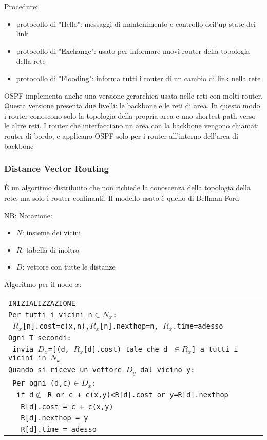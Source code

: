 \documentclass[12pt, a4paper]{article}
\begin{document}
Procedure:
\begin{itemize}
    \item protocollo di "Hello": messaggi di mantenimento e controllo deil'up-state dei link
    \item protocollo di "Exchange": usato per informare nuovi router della topologia della rete
    \item protocollo di "Flooding": informa tutti i router di un cambio di link nella rete
\end{itemize}

OSPF implementa anche una versione gerarchica usata nelle reti con molti router. Questa versione presenta due livelli:
le backbone e le reti di area. In questo modo i router conoscono solo la topologia della propria area e uno 
shortest path verso le altre reti. I router che interfacciano un area con la backbone vengono chiamati router di 
bordo, e applicano OSPF solo per i router all'interno dell'area di backbone

\subsubsection{Distance Vector Routing}
È un algoritmo distribuito che non richiede la conoscenza della topologia della rete, ma solo i router confinanti.
Il modello usato è quello di Bellman-Ford 

NB: Notazione:
\begin{itemize}
    \item $N$: insieme dei vicini
    \item $R$: tabella di inoltro
    \item $D$: vettore con tutte le distanze
\end{itemize}

Algoritmo per il nodo $x$:
\begin{center}
    \begin{tabular}{l}
        \texttt{INIZIALIZZAZIONE}\\
        \texttt{Per tutti i vicini n$\in N_{x}$:}\\
        \texttt{ $R_{x}$[n].cost=c(x,n),$R_{x}$[n].nexthop=n, $R_{x}$.time=adesso}\\
        \texttt{Ogni T secondi:}\\
        \texttt{ invia $D_{x}$=[(d, $R_{x}$[d].cost) tale che d $\in R_{x}$] a tutti i vicini in $N_{x}$}\\
        \texttt{Quando si riceve un vettore $D_{y}$ dal vicino y:}\\
        \texttt{ Per ogni (d,c)$\in D_{x}$:}\\
        \texttt{ \ if d$\notin$ R or c + c(x,y)<R[d].cost or y=R[d].nexthop}\\
        \texttt{ \ \ R[d].cost = c + c(x,y)}\\
        \texttt{ \ \ R[d].nexthop = y}\\
        \texttt{ \ \ R[d].time = adesso }\\
    \end{tabular}
\end{center}
\end{document}
